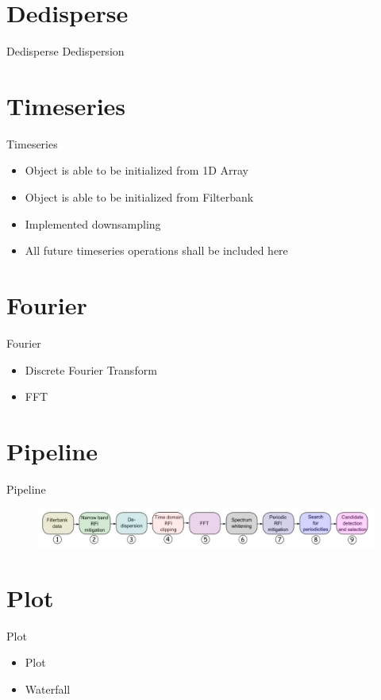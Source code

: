 \documentclass{beamer}
\begin{document}
\section{Dedisperse}
\begin{frame}{Dedisperse}
	Dedispersion
\end{frame}

\section{Timeseries}
\begin{frame}{Timeseries}
	\begin{itemize}
		\item Object is able to be initialized from 1D Array
		\item Object is able to be initialized from Filterbank
		\item Implemented downsampling
		\item All future timeseries operations shall be included here
	\end{itemize}
\end{frame}

\section{Fourier}
\begin{frame}{Fourier}
	\begin{itemize}
		\item Discrete Fourier Transform
		\item FFT
	\end{itemize}
\end{frame}

\section{Pipeline}
\begin{frame}{Pipeline}
	\begin{figure}
		\includegraphics[width=\textwidth]{pipeline-order}
	\end{figure}
\end{frame}

\section{Plot}
\begin{frame}{Plot}
	\begin{itemize}
		\item Plot
		\item Waterfall
	\end{itemize}
\end{frame}
\end{document}
